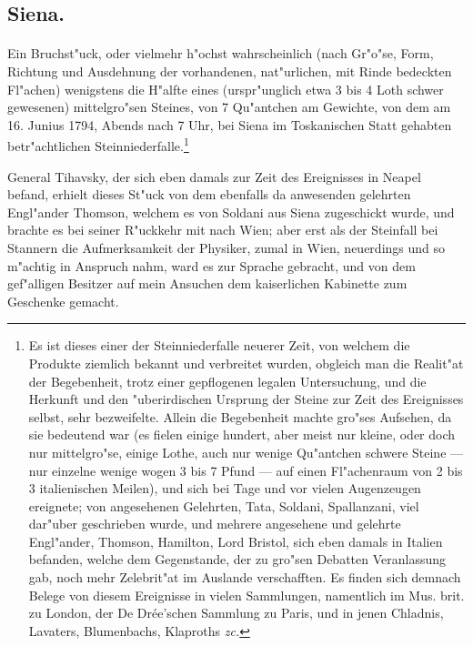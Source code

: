\documentclass[a4paper, 11pt, oneside, german]{article}
\begin{document}
\subsection{Siena.}
\paragraph{}
Ein Bruchst"uck, oder vielmehr h"ochst wahrscheinlich (nach Gr"o"se, Form, Richtung und Ausdehnung der vorhandenen, nat"urlichen, mit Rinde bedeckten Fl"achen) wenigstens die H"alfte eines (urspr"unglich etwa 3 bis 4 Loth schwer gewesenen) mittelgro"sen Steines, von 7 Qu"antchen am Gewichte, von dem am 16. Junius 1794, Abends nach 7 Uhr, bei Siena im Toskanischen Statt gehabten betr"achtlichen Steinniederfalle.\footnote{Es ist dieses einer der Steinniederfalle neuerer Zeit, von welchem die Produkte ziemlich bekannt und verbreitet wurden, obgleich man die Realit"at der Begebenheit, trotz einer gepflogenen legalen Untersuchung, und die Herkunft und den "uberirdischen Ursprung der Steine zur Zeit des Ereignisses selbst, sehr bezweifelte. Allein die Begebenheit machte gro"ses Aufsehen, da sie bedeutend war (es fielen einige hundert, aber meist nur kleine, oder doch nur mittelgro"se, einige Lothe, auch nur wenige Qu"antchen schwere Steine --- nur einzelne wenige wogen 3 bis 7 Pfund --- auf einen Fl"achenraum von 2 bis 3 italienischen Meilen), und sich bei Tage und vor vielen Augenzeugen ereignete; von angesehenen Gelehrten, Tata, Soldani, Spallanzani, viel dar"uber geschrieben wurde, und mehrere angesehene und gelehrte Engl"ander, Thomson, Hamilton, Lord Bristol, sich eben damals in Italien befanden, welche dem Gegenstande, der zu gro"sen Debatten Veranlassung gab, noch mehr Zelebrit"at im Auslande verschafften. Es finden sich demnach Belege von diesem Ereignisse in vielen Sammlungen, namentlich im Mus. brit. zu London, der De Drée'schen Sammlung zu Paris, und in jenen Chladnis, Lavaters, Blumenbachs, Klaproths \emph{zc.}}

General Tihavsky, der sich eben damals zur Zeit des Ereignisses in Neapel befand, erhielt dieses St"uck von dem ebenfalls da anwesenden gelehrten Engl"ander Thomson, welchem es von Soldani aus Siena zugeschickt wurde, und brachte es bei seiner R"uckkehr mit nach Wien; aber erst als der Steinfall bei Stannern die Aufmerksamkeit der Physiker, zumal in Wien, neuerdings und so m"achtig in Anspruch nahm, ward es zur Sprache gebracht, und von dem gef"alligen Besitzer auf mein Ansuchen dem kaiserlichen Kabinette zum Geschenke gemacht.
\end{document}
